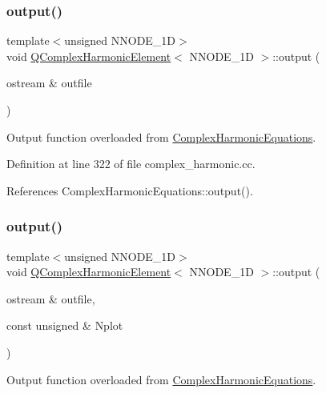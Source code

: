\subsubsection{\texorpdfstring{output()}{output()}\hspace{0.1cm}{\footnotesize\ttfamily [1/2]}}
{\footnotesize\ttfamily template$<$unsigned N\+N\+O\+D\+E\+\_\+1D$>$ \\
void \hyperlink{classQComplexHarmonicElement}{Q\+Complex\+Harmonic\+Element}$<$ N\+N\+O\+D\+E\+\_\+1D $>$\+::output (\begin{DoxyParamCaption}\item[{ostream \&}]{outfile }\end{DoxyParamCaption})\hspace{0.3cm}{\ttfamily [inline]}}



Output function overloaded from \hyperlink{classComplexHarmonicEquations}{Complex\+Harmonic\+Equations}. 



Definition at line 322 of file complex\+\_\+harmonic.\+cc.



References Complex\+Harmonic\+Equations\+::output().

\mbox{\label{classQComplexHarmonicElement_a7f63f8532a6295a3ba86f94355f889b8}} 
\subsubsection{\texorpdfstring{output()}{output()}\hspace{0.1cm}{\footnotesize\ttfamily [2/2]}}
{\footnotesize\ttfamily template$<$unsigned N\+N\+O\+D\+E\+\_\+1D$>$ \\
void \hyperlink{classQComplexHarmonicElement}{Q\+Complex\+Harmonic\+Element}$<$ N\+N\+O\+D\+E\+\_\+1D $>$\+::output (\begin{DoxyParamCaption}\item[{ostream \&}]{outfile,  }\item[{const unsigned \&}]{Nplot }\end{DoxyParamCaption})\hspace{0.3cm}{\ttfamily [inline]}}



Output function overloaded from \hyperlink{classComplexHarmonicEquations}{Complex\+Harmonic\+Equations}. 



